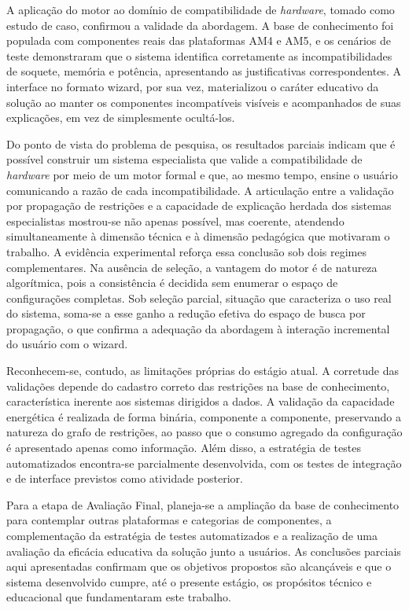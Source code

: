 A aplicação do motor ao domínio de compatibilidade de \textit{hardware}, tomado como estudo de caso,
confirmou a validade da abordagem. A base de conhecimento foi populada com componentes
reais das plataformas AM4 e AM5, e os cenários de teste demonstraram que o sistema
identifica corretamente as incompatibilidades de soquete, memória e potência, apresentando
as justificativas correspondentes. A interface no formato wizard, por sua vez, materializou
o caráter educativo da solução ao manter os componentes incompatíveis visíveis e
acompanhados de suas explicações, em vez de simplesmente ocultá-los.

Do ponto de vista do problema de pesquisa, os resultados parciais indicam que é possível
construir um sistema especialista que valide a compatibilidade de \textit{hardware} por meio de um
motor formal e que, ao mesmo tempo, ensine o usuário comunicando a razão de cada
incompatibilidade. A articulação entre a validação por propagação de restrições e a
capacidade de explicação herdada dos sistemas especialistas mostrou-se não apenas possível,
mas coerente, atendendo simultaneamente à dimensão técnica e à dimensão pedagógica que
motivaram o trabalho. A evidência experimental reforça essa conclusão sob dois regimes
complementares. Na ausência de seleção, a vantagem do motor é de natureza algorítmica, pois
a consistência é decidida sem enumerar o espaço de configurações completas. Sob seleção
parcial, situação que caracteriza o uso real do sistema, soma-se a esse ganho a redução
efetiva do espaço de busca por propagação, o que confirma a adequação da abordagem à
interação incremental do usuário com o wizard.

Reconhecem-se, contudo, as limitações próprias do estágio atual. A corretude das validações
depende do cadastro correto das restrições na base de conhecimento, característica inerente
aos sistemas dirigidos a dados. A validação da capacidade energética é realizada de forma
binária, componente a componente, preservando a natureza do grafo de restrições, ao passo
que o consumo agregado da configuração é apresentado apenas como informação. Além disso, a
estratégia de testes automatizados encontra-se parcialmente desenvolvida, com os testes de
integração e de interface previstos como atividade posterior.

Para a etapa de Avaliação Final, planeja-se a ampliação da base de conhecimento para
contemplar outras plataformas e categorias de componentes, a complementação da estratégia
de testes automatizados e a realização de uma avaliação da eficácia educativa da solução
junto a usuários. As conclusões parciais aqui apresentadas confirmam que os objetivos
propostos são alcançáveis e que o sistema desenvolvido cumpre, até o presente estágio, os
propósitos técnico e educacional que fundamentaram este trabalho.